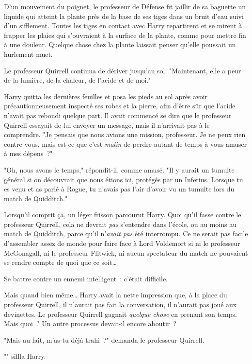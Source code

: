 D'un mouvement du poignet, le professeur de Défense fit jaillir de sa baguette un liquide qui atteint la plante près de la base de ses tiges dans un bruit d'eau suivi d'un sifflement. Toutes les tiges en contact avec Harry repartirent et se mirent à frapper les plaies qui s'ouvraient à la surface de la plante, comme pour mettre fin à une douleur. Quelque chose chez la plante laissait penser qu'elle poussait un hurlement muet.

Le professeur Quirrell continua de dériver jusqu'au sol. "Maintenant, elle a peur de la lumière, de la chaleur, de l'acide et de moi."

Harry quitta les dernières feuilles et posa les pieds au sol après avoir précautionneusement inspecté ses robes et la pierre, afin d'être sûr que l'acide n'avait pas rebondi quelque part. Il avait commencé se dire que le professeur Quirrell essayait de lui envoyer un message, mais il n'arrivait pas à le comprendre. "Je pensais que nous avions une mission, professeur. Je ne peux rien contre vous, mais est-ce que c'est \emph{malin} de perdre autant de temps à vous amuser à mes dépens~?"

"Oh, nous avons le temps," répondit-il, comme amusé. "Il y aurait un tumulte général si on découvrait que nous étions ici, protégés par un Inferius. Lorsque tu es venu et as parlé à Rogue, tu n'avais pas l'air d'avoir vu un tumulte lors du match de Quidditch."

Lorsqu'il comprit ça, un léger frisson parcourut Harry. Quoi qu'il fasse contre le professeur Quirrell, cela ne devrait \emph{pas} s'entendre dans l'école, ou au moins au match de Quidditch, parce qu'il n'\emph{avait pas} été interrompu. Ce ne serait pas facile d'assembler assez de monde pour faire face à Lord Voldemort si ni le professeur McGonagall, ni le professeur Flitwick, ni aucun spectateur du match ne pouvaient se rendre compte de quoi que ce soit…

Se battre contre un ennemi intelligent~: c'était difficile.

Mais quand bien même… Harry avait la nette impression que, à la place du professeur Quirrell, il n'aurait pas fait la conversation, il n'aurait pas joué aux devinettes. Le professeur Quirrell gagnait \emph{quelque chose} en prenant son temps. Mais quoi~? Un autre processus devait-il encore aboutir~?

"Mais au fait, m'as-tu déjà trahi~?" demanda le professeur Quirrell.

"" siffla Harry.

